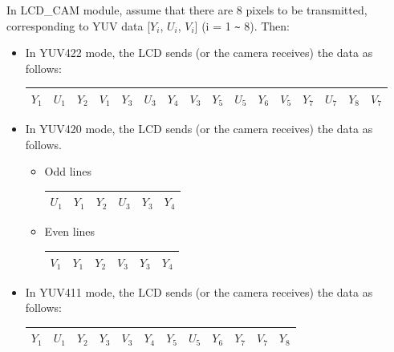 \documentclass[main\_\_EN.tex]{subfiles}
\begin{document}
In LCD\_CAM module, assume that there are 8 pixels to be transmitted, corresponding to YUV data [$Y_i$, $U_i$, $V_i$] (i = 1 \verb+~+ 8). Then:
\begin{itemize}
    \item In YUV422 mode, the LCD sends (or the camera receives) the data as follows:
        \begin{table}[H]
            \centering
            \begin{tabular}{|c|c|c|c|c|c|c|c|c|c|c|c|c|c|c|c|}
            \hline
            $Y_1$ & $U_1$ & $Y_2$ & $V_1$ & $Y_3$ & $U_3$ & $Y_4$ & $V_3$ & $Y_5$ & $U_5$ & $Y_6$ & $V_5$ & $Y_7$ & $U_7$ & $Y_8$ & $V_7$ \\ \hline
            \end{tabular}
        \end{table}
        
        
    \item In YUV420 mode, the LCD sends (or the camera receives) the data as follows.
    \begin{itemize}
        \item Odd lines
        \begin{table}[H]
            \centering
            \begin{tabular}{|c|c|c|c|c|c|}
            \hline
            $U_1$ & $Y_1$ & $Y_2$ & $U_3$ & $Y_3$ & $Y_4$ \\ \hline
            \end{tabular}
        \end{table}
        \item Even lines
        \begin{table}[H]
            \centering
            \begin{tabular}{|c|c|c|c|c|c|}
            \hline
            $V_1$ & $Y_1$ & $Y_2$ & $V_3$ & $Y_3$ & $Y_4$ \\ \hline
            \end{tabular}
        \end{table}
    \end{itemize}

    \item In YUV411 mode, the LCD sends (or the camera receives) the data as follows:
        \begin{table}[H]
            \centering
            \begin{tabular}{|c|c|c|c|c|c|c|c|c|c|c|c|}
            \hline
            $Y_1$ & $U_1$ & $Y_2$ & $Y_3$ & $V_3$ & $Y_4$ & $Y_5$ & $U_5$ & $Y_6$ & $Y_7$ & $V_7$ & $Y_8$ \\ \hline
            \end{tabular}
        \end{table}
\end{itemize}
\end{document}

